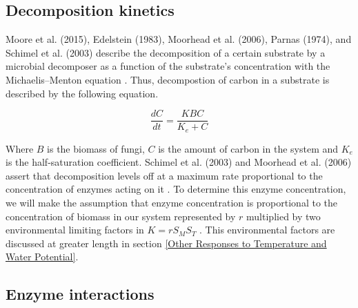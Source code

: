 \documentclass[12pt]{article}
\begin{document}
\begin{multicols}{2}
\subsection{Decomposition kinetics}
Moore et al. (2015), Edelstein (1983), Moorhead et al. (2006), Parnas (1974), and Schimel et al. (2003) describe the decomposition of a certain substrate by a microbial decomposer as a function of the substrate's concentration with the Michaelis–Menton equation \cite{Moore2015, Edelstein1983, Moorhead2006, Parnas1975, Schimel2003}. Thus, decompostion of carbon in a substrate is described by the following equation.

\begin{equation} \label{eq:3}
\frac{dC}{dt} = \frac{KBC}{K_{e}+C}
\end{equation}

Where $B$ is the biomass of fungi, $C$ is the amount of carbon in the system and $K_{e}$ is the half-saturation coefficient. Schimel et al. (2003) and Moorhead et al. (2006) assert that decomposition levels off at a maximum rate proportional to the concentration of enzymes acting on it \cite{Schimel2003, Moorhead2006}. To determine this enzyme concentration, we will make the assumption that enzyme concentration is proportional to the concentration of biomass in our system represented by $r$ multiplied by two environmental limiting factors in $K=rS_{M}S_{T}$ \cite{Schimel2003}. This environmental factors are discussed at greater length in section \ref{Other Responses to Temperature and Water Potential}.

\subsection{Enzyme interactions}


\end{multicols}
\end{document}
